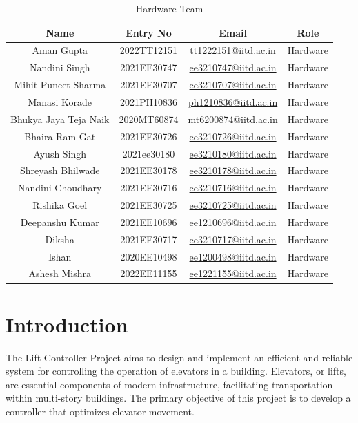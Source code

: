 \documentclass{article}
\begin{document}
\pagebreak
\begin{table}
\begin{center}
\begin{tabular}{|c|c|c|c|}
\hline
Name & Entry No  & Email  & Role \\
\hline
Aman Gupta & 2022TT12151 & \href{mailto:tt1222151@iitd.ac.in}{tt1222151@iitd.ac.in} & Hardware \\ 
Nandini Singh & 2021EE30747 & \href{mailto:ee3210747@iitd.ac.in}{ee3210747@iitd.ac.in} & Hardware \\ 
Mihit Puneet Sharma & 2021EE30707 & \href{mailto:ee3210707@iitd.ac.in}{ee3210707@iitd.ac.in} & Hardware \\ 
Manasi Korade & 2021PH10836 & \href{mailto:ph1210836@iitd.ac.in}{ph1210836@iitd.ac.in} & Hardware \\ 
Bhukya Jaya Teja Naik & 2020MT60874 & \href{mailto:mt6200874@iitd.ac.in}{mt6200874@iitd.ac.in} & Hardware \\ 
Bhaira Ram Gat & 2021EE30726 & \href{mailto:ee3210726@iitd.ac.in}{ee3210726@iitd.ac.in} & Hardware \\ 
Ayush Singh & 2021ee30180 & \href{mailto:ee3210180@iitd.ac.in}{ee3210180@iitd.ac.in} & Hardware \\ 
Shreyash Bhilwade & 2021EE30178 & \href{mailto:ee3210178@iitd.ac.in}{ee3210178@iitd.ac.in} & Hardware \\ 
Nandini Choudhary & 2021EE30716 & \href{mailto:ee3210716@iitd.ac.in}{ee3210716@iitd.ac.in} & Hardware \\ 
Rishika Goel & 2021EE30725 & \href{mailto:ee3210725@iitd.ac.in}{ee3210725@iitd.ac.in} & Hardware \\ 
Deepanshu Kumar & 2021EE10696 & \href{mailto:ee1210696@iitd.ac.in}{ee1210696@iitd.ac.in} & Hardware \\ 
Diksha & 2021EE30717 & \href{mailto:ee3210717@iitd.ac.in}{ee3210717@iitd.ac.in} & Hardware \\ 
Ishan & 2020EE10498 & \href{mailto:ee1200498@iitd.ac.in}{ee1200498@iitd.ac.in} & Hardware \\ 
Ashesh Mishra & 2022EE11155 & \href{mailto:ee1221155@iitd.ac.in}{ee1221155@iitd.ac.in} & Hardware \\ 
\hline
\end{tabular}
\caption{Hardware Team}
\end{center}
\end{table}
\clearpage
\section{Introduction}
The Lift Controller Project aims to design and implement an efficient and reliable system for controlling the operation of elevators in a building. Elevators, or lifts, are essential components of modern infrastructure, facilitating transportation within multi-story buildings. The primary objective of this project is to develop a controller that optimizes elevator movement.\\ 
\vspace{2mm}
\end{document}
